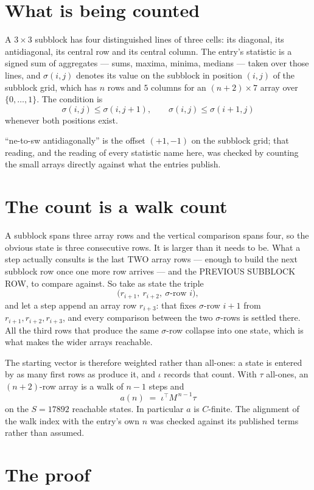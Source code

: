 \documentclass[11pt,a4paper]{article}
\theoremstyle{plain}
\theoremstyle{definition}
\begin{document}
\section{What is being counted}

A $3\times3$ subblock has four distinguished lines of three cells: its diagonal, its
antidiagonal, its central row and its central column. The entry's statistic is a signed sum of
aggregates --- sums, maxima, minima, medians --- taken over those lines, and $\sigma(i,j)$
denotes its value on the subblock in position $(i,j)$ of the subblock grid, which has $n$ rows
and $5$ columns for an $(n+2)\times7$ array over $\{0,\dots,1\}$. The condition is
\[
\sigma(i,j)\le\sigma(i,j+1),\qquad \sigma(i,j)\le\sigma(i+1,j)
\]
whenever both positions exist.

``ne-to-sw antidiagonally'' is the offset $(+1,-1)$ on the subblock grid; that reading, and
the reading of every statistic name here, was checked by counting the small arrays directly
against what the entries publish.

\section{The count is a walk count}

A subblock spans three array rows and the vertical comparison spans four, so the obvious state
is three consecutive rows. It is larger than it needs to be. What a step actually consults is
the last TWO array rows --- enough to build the next subblock row once one more row arrives ---
and the PREVIOUS SUBBLOCK ROW, to compare against. So take as state the triple
\[
\bigl(r_{i+1},\ r_{i+2},\ \sigma\text{-row }i\bigr),
\]
and let a step append an array row $r_{i+3}$: that fixes $\sigma$-row $i+1$ from
$r_{i+1},r_{i+2},r_{i+3}$, and every comparison between the two $\sigma$-rows is settled
there. All the third rows that produce the same $\sigma$-row collapse into one state, which is
what makes the wider arrays reachable.

The starting vector is therefore weighted rather than all-ones: a state is entered by as many
first rows as produce it, and $\iota$ records that count. With $\tau$ all-ones, an
$(n+2)$-row array is a walk of $n-1$ steps and
\[
a(n)\;=\;\iota^{\!\top}M^{\,n-1}\tau
\]
on the $S=17892$ reachable states. In particular $a$ is $C$-finite. The alignment of the walk
index with the entry's own $n$ was checked against its published terms rather than assumed.

\section{The proof}
\end{document}

